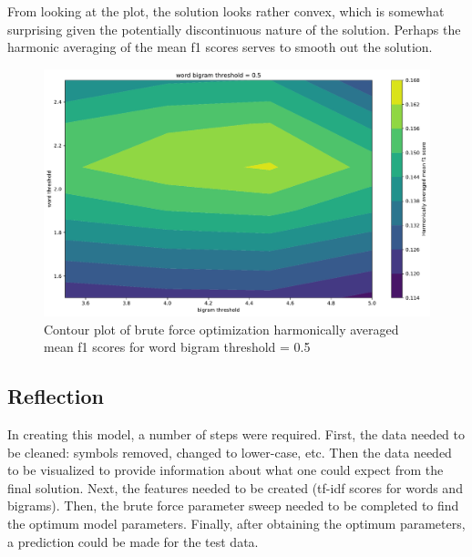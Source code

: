 \documentclass{article}
\begin{document}
From looking at the plot, the solution looks rather convex, which is somewhat
surprising given the potentially discontinuous nature of the solution. Perhaps
the harmonic averaging of the mean f1 scores serves to smooth out the solution.

\begin{figure}[]
\includegraphics[width=\textwidth]{figures/OptimizationSlice.pdf}
\caption{Contour plot of brute force optimization harmonically averaged mean
  f1 scores for word bigram threshold = 0.5}
\label{fig:training_slice}
\end{figure}




\subsection{Reflection}

In creating this model, a number of steps were required. First, the data
needed to be cleaned: symbols removed, changed to lower-case, etc. Then the
data needed to be visualized to provide information about what one could
expect from the final solution. Next, the features needed to be created
(tf-idf scores for words and bigrams). Then, the brute force parameter
sweep needed to be completed to find the optimum model parameters. Finally,
after obtaining the optimum parameters, a prediction could be made for the
test data.
\end{document}
